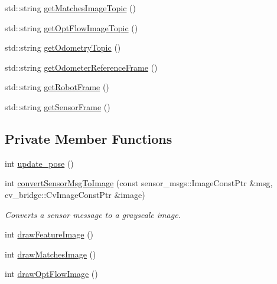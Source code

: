 \begin{DoxyCompactItemize}
std\-::string \hyperlink{classLRM_1_1MonoOdometer_a0b5b603776c1c011d1268dc029dee6ae}{get\-Matches\-Image\-Topic} ()
\item 
std\-::string \hyperlink{classLRM_1_1MonoOdometer_acde0fd05b19f524bace7c71de9a0cc36}{get\-Opt\-Flow\-Image\-Topic} ()
\item 
std\-::string \hyperlink{classLRM_1_1MonoOdometer_a16eaa3716cb077ef993fa66a582fe65e}{get\-Odometry\-Topic} ()
\item 
std\-::string \hyperlink{classLRM_1_1MonoOdometer_ac989d0a61c0b18c7e538732668953fa1}{get\-Odometer\-Reference\-Frame} ()
\item 
std\-::string \hyperlink{classLRM_1_1MonoOdometer_a3550a896dd2e212fa177d7401f1a5b61}{get\-Robot\-Frame} ()
\item 
std\-::string \hyperlink{classLRM_1_1MonoOdometer_a72b47de741d2c273a34c7d4e9a093092}{get\-Sensor\-Frame} ()
\end{DoxyCompactItemize}
\subsection*{\-Private \-Member \-Functions}
\begin{DoxyCompactItemize}
\item 
int \hyperlink{classLRM_1_1MonoOdometer_a8c7914efde9c07323c171d7adfaf656e}{update\-\_\-pose} ()
\item 
int \hyperlink{classLRM_1_1MonoOdometer_ab33c598738d4c565cae80ca110f3ab63}{convert\-Sensor\-Msg\-To\-Image} (const sensor\-\_\-msgs\-::\-Image\-Const\-Ptr \&msg, cv\-\_\-bridge\-::\-Cv\-Image\-Const\-Ptr \&image)
\begin{DoxyCompactList}\small\item\em \-Converts a sensor message to a grayscale image. \end{DoxyCompactList}\item 
int \hyperlink{classLRM_1_1MonoOdometer_acdfde454162a9fba808c5e99069e5831}{draw\-Feature\-Image} ()
\item 
int \hyperlink{classLRM_1_1MonoOdometer_a0e648fa164c12e1bb405c5e0de9607cf}{draw\-Matches\-Image} ()
\item 
int \hyperlink{classLRM_1_1MonoOdometer_ac3e11ffd664dfd8b06068f77dd475ed4}{draw\-Opt\-Flow\-Image} ()
\end{DoxyCompactItemize}
